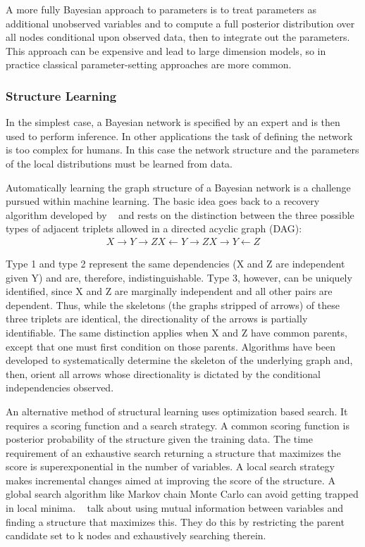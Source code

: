 A more fully Bayesian approach to parameters is to treat parameters as additional unobserved variables and to compute a full posterior distribution over all nodes conditional upon observed data, then to integrate out the parameters. This approach can be expensive and lead to large dimension models, so in practice classical parameter-setting approaches are more common.

\subsubsection{Structure Learning}
In the simplest case, a Bayesian network is specified by an expert and is then used to perform inference. In other applications the task of defining the network is too complex for humans. In this case the network structure and the parameters of the local distributions must be learned from data.

Automatically learning the graph structure of a Bayesian network is a challenge pursued within machine learning. The basic idea goes back to a recovery algorithm developed by ~\cite{recovery} and rests on the distinction between the three possible types of adjacent triplets allowed in a directed acyclic graph (DAG):
\begin{align*}
  X \rightarrow Y \rightarrow Z
  X \leftarrow Y \rightarrow Z
  X \rightarrow Y \leftarrow Z
\end{align*}

Type 1 and type 2 represent the same dependencies (X and Z are independent given Y) and are, therefore, indistinguishable. Type 3, however, can be uniquely identified, since X and Z are marginally independent and all other pairs are dependent. Thus, while the skeletons (the graphs stripped of arrows) of these three triplets are identical, the directionality of the arrows is partially identifiable. The same distinction applies when X and Z have common parents, except that one must first condition on those parents. Algorithms have been developed to systematically determine the skeleton of the underlying graph and, then, orient all arrows whose directionality is dictated by the conditional independencies observed.~\cite{causality}

An alternative method of structural learning uses optimization based search. It requires a scoring function and a search strategy. A common scoring function is posterior probability of the structure given the training data. The time requirement of an exhaustive search returning a structure that maximizes the score is superexponential in the number of variables. A local search strategy makes incremental changes aimed at improving the score of the structure. A global search algorithm like Markov chain Monte Carlo can avoid getting trapped in local minima. ~\cite{friedman} talk about using mutual information between variables and finding a structure that maximizes this. They do this by restricting the parent candidate set to k nodes and exhaustively searching therein.

